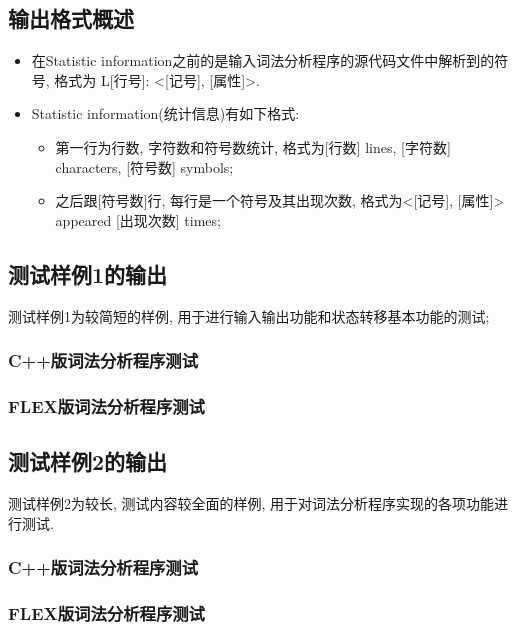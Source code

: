 \subsection{输出格式概述}
\begin{itemize}
  \item 在Statistic information之前的是输入词法分析程序的源代码文件中解析到的符号, 格式为
L[行号]: <[记号], [属性]>.
  \item Statistic information(统计信息)有如下格式:
  \begin{itemize}
    \item 第一行为行数, 字符数和符号数统计, 格式为[行数] lines, [字符数] characters,
    [符号数] symbols;
    \item 之后跟[符号数]行, 每行是一个符号及其出现次数, 格式为<[记号], [属性]> appeared
     [出现次数] times;
  \end{itemize}
\end{itemize}

\subsection{测试样例1的输出}
测试样例1为较简短的样例, 用于进行输入输出功能和状态转移基本功能的测试;
\subsubsection{C++版词法分析程序测试}

\subsubsection{FLEX版词法分析程序测试}

\subsection{测试样例2的输出}
测试样例2为较长, 测试内容较全面的样例, 用于对词法分析程序实现的各项功能进行测试.
\subsubsection{C++版词法分析程序测试}

\subsubsection{FLEX版词法分析程序测试}

